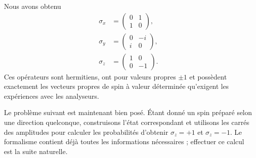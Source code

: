 \begin{classroomqa}\end{classroomqa}

Nous avons obtenu
\begin{equation}
\begin{aligned}
\sigma_x&=\begin{pmatrix}0&1\\1&0\end{pmatrix},\\[0.4em]
\sigma_y&=\begin{pmatrix}0&-i\\i&0\end{pmatrix},\\[0.4em]
\sigma_z&=\begin{pmatrix}1&0\\0&-1\end{pmatrix}.
\end{aligned}
\label{eq:pauli-triple}
\end{equation}
Ces opérateurs sont hermitiens, ont pour valeurs propres \(\pm1\) et possèdent exactement les vecteurs propres de spin à valeur déterminée qu’exigent les expériences avec les analyseurs.

Le problème suivant est maintenant bien posé. Étant donné un spin préparé selon une direction quelconque, construisons l’état correspondant et utilisons les carrés des amplitudes pour calculer les probabilités d’obtenir \(\sigma_z=+1\) et \(\sigma_z=-1\). Le formalisme contient déjà toutes les informations nécessaires ; effectuer ce calcul est la suite naturelle.